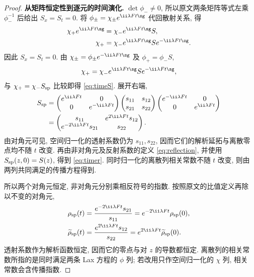 \begin{proof}
\par\medskip\noindent\textbf{从矩阵恒定性到逐元的时间演化.}\quad 
$\det\phi_-\ne0$, 所以原文两条矩阵等式左乘
$\phi_-^{-1}$ 后给出 $S_x=S_t=0$.
将 $\phi_\pm=\chi_\pm e^{\ii\lambda Ft\sg}$
代回散射关系, 得
\begin{align*}
\chi_+e^{\ii\lambda Ft\sg}
&=\chi_-e^{\ii\lambda Ft\sg}S,\\
\chi_+&=\chi_-e^{\ii\lambda Ft\sg}Se^{-\ii\lambda Ft\sg}.
\end{align*}
因此 $S_x=S_t=0$. 由 $\chi_\pm=\phi_\pm e^{-\ii\lambda Ft\sg}$ 及 $\phi_+=\phi_-S$,
\[
\chi_+=\chi_-e^{\ii\lambda Ft\sg}S e^{-\ii\lambda Ft\sg},
\]
与 $\chi_+=\chi_-S_{\rm sp}$ 比较即得 \eqref{eq:timeS}. 展开右端,
\begin{align*}
S_{\rm sp}
&=\begin{pmatrix}e^{\ii\lambda Ft}&0\\0&e^{-\ii\lambda Ft}\end{pmatrix}
\begin{pmatrix}s_{11}&s_{12}\\s_{21}&s_{22}\end{pmatrix}
\begin{pmatrix}e^{-\ii\lambda Ft}&0\\0&e^{\ii\lambda Ft}\end{pmatrix}\\
&=\begin{pmatrix}
s_{11}&e^{2\ii\lambda Ft}s_{12}\\
e^{-2\ii\lambda Ft}s_{21}&s_{22}
\end{pmatrix}.
\end{align*}
由对角元可见, 空间归一化的透射系数仍为 $s_{11},s_{22}$, 因而它们的解析延拓与离散零点均不随 $t$ 改变. 再由非对角元及反射系数的定义 \eqref{eq:reflection}, 并使用 $S_{\rm sp}(z,0)=S(z)$, 得到 \eqref{eq:timer}. 同时归一化的离散列相关常数不随 $t$ 改变, 则由两列共同满足的传播方程得到.

所以两个对角元恒定, 非对角元分别乘相反符号的指数.
按照原文的比值定义再除以不变的对角元,
\begin{align*}
\rho_{\rm sp}(t)
&=\dfrac{e^{-2\ii\lambda Ft}s_{21}}{s_{11}}
=e^{-2\ii\lambda Ft}\rho_{\rm sp}(0),\\
\widetilde\rho_{\rm sp}(t)
&=\dfrac{e^{2\ii\lambda Ft}s_{12}}{s_{22}}
=e^{2\ii\lambda Ft}\widetilde\rho_{\rm sp}(0).
\end{align*}
透射系数作为解析函数恒定, 因而它的零点与对 $z$ 的导数都恒定.
离散列的相关常数所指的是同时满足两条 Lax 方程的 $\phi$ 列;
若改用只作空间归一化的 $\chi$ 列, 相关常数会含传播指数.
\end{proof}

